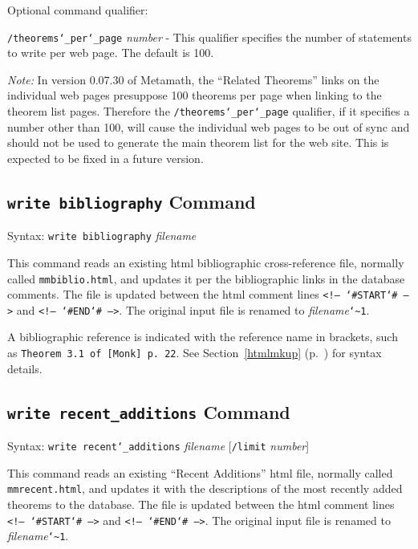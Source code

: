 Optional command qualifier:

    \texttt{/theorems{\char`\_}per{\char`\_}page} {\em number} -
 This qualifier specifies the number of statements to
        write per web page.  The default is 100.

{\em Note:} In version 0.07.30 of Metamath, the ``Related Theorems'' links on the individual
web pages presuppose 100 theorems per page when linking to the theorem
list pages.  Therefore the \texttt{/theorems{\char`\_}per{\char`\_}page}
qualifier, if it specifies a number other than 100, will cause the
individual web pages to be out of sync and should not be used to
generate the main theorem list for the web site.  This is expected to be
fixed in a future version.


\subsection{\texttt{write bibliography}\label{wrbib}
Command}
Syntax:  \texttt{write bibliography} {\em filename}

This command reads an existing {\sc html} bibliographic cross-reference
file, normally called \texttt{mmbiblio.html}, and updates it per the
bibliographic links in the database comments.  The file is updated
between the {\sc html} comment lines \texttt{<!--
{\char`\#}START{\char`\#} -->} and \texttt{<!-- {\char`\#}END{\char`\#}
-->}.  The original input file is renamed to {\em
filename}\texttt{{\char`\~}1}.

A bibliographic reference is indicated with the reference name
in brackets, such as  \texttt{Theorem 3.1 of
[Monk] p.\ 22}.
See Section~\ref{htmlmkup} (p.~\pageref{htmlmkup}) for
syntax details.


\subsection{\texttt{write recent\_additions}
Command}
Syntax:  \texttt{write recent{\char`\_}additions} {\em filename}
[\texttt{/limit} {\em number}]

This command reads an existing ``Recent Additions'' {\sc html} file,
normally called \texttt{mmrecent.html}, and updates it with the
descriptions of the most recently added theorems to the database.
 The file is updated between
the {\sc html} comment lines \texttt{<!-- {\char`\#}START{\char`\#} -->}
and \texttt{<!-- {\char`\#}END{\char`\#} -->}.  The original input file
is renamed to {\em filename}\texttt{{\char`\~}1}.

